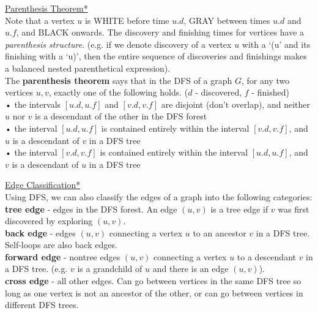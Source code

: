 \documentclass[12pt, fleqn]{general}
\begin{document}
\begin{multicols*}{2}
    \underline{Parenthesis Theorem*}\\
    
    Note that a vertex $u$ is WHITE before time $u.d$, GRAY between times $u.d$ and $u.f$, and BLACK onwards. The discovery and finishing times for vertices have a \emph{parenthesis structure}. (e.g. if we denote discovery of a vertex $u$ with a `(u' and its finishing with a `u)', then the entire sequence of discoveries and finishings makes a balanced nested parenthetical expression).\\

    The \textbf{parenthesis theorem} says that in the DFS of a graph $G$, for any two vertices $u, v$, exactly one of the following holds. ($d$ - discovered, $f$ - finished)\\

    • the intervals $[u.d, u.f]$ and $[v.d, v.f]$ are disjoint (don't overlap), and neither $u$ nor $v$ is a descendant of the other in the DFS forest\\
    • the interval $[u.d, u.f]$ is contained entirely within the interval $[v.d, v.f]$, and $u$ is a descendant of $v$ in a DFS tree\\
    • the interval $[v.d, v.f]$ is contained entirely within the interval $[u.d, u.f]$, and $v$ is a descendant of $u$ in a DFS tree

    \underline{Edge Classification*}\\

    Using DFS, we can also classify the edges of a graph into the following categories:\\

    \textbf{tree edge} - edges in the DFS forest. An edge $(u, v)$ is a tree edge if $v$ was first discovered by exploring $(u, v)$.\\

    \textbf{back edge} - edges $(u, v)$ connecting a vertex $u$ to an ancestor $v$ in a DFS tree. Self-loops are also back edges.\\

    \textbf{forward edge} - nontree edges $(u, v)$ connecting a vertex $u$ to a descendant $v$ in a DFS tree. (e.g. $v$ is a grandchild of $u$ and there is an edge $(u, v)$).\\

    \textbf{cross edge} - all other edges. Can go between vertices in the same DFS tree so long as one vertex is not an ancestor of the other, or can go between vertices in different DFS trees.\\


\end{multicols*}
\end{document}
